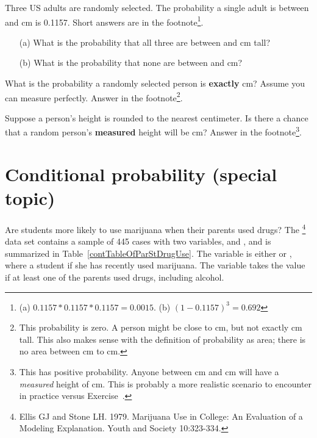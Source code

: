 \begin{exercise}
Three US adults are randomly selected. The probability a single adult is between  and  cm is 0.1157. Short answers are in the footnote\footnote{(a) $0.1157 * 0.1157 * 0.1157 = 0.0015$. (b) $(1-0.1157)^3 = 0.692$}. \vspace{-1.5mm}
\begin{enumerate}
\setlength{\itemsep}{0mm}
\item[(a)] What is the probability that all three are between  and  cm tall?
\item[(b)] What is the probability that none are between  and  cm?
\end{enumerate}
\end{exercise}

\begin{exercise}\label{probabilityOfExactly180cm}
What is the probability a randomly selected person is \textbf{exactly}  cm? Assume you can measure perfectly. Answer in the footnote\footnote{This probability is zero. A person might be close to  cm, but not exactly  cm tall. This also makes sense with the definition of probability as area; there is no area between  cm to  cm.}.
\end{exercise}

\begin{exercise}
Suppose a person's height is rounded to the nearest centimeter. Is there a chance that a random person's \textbf{measured} height will be  cm? Answer in the footnote\footnote{This has positive probability. Anyone between  cm and  cm will have a \emph{measured} height of  cm. This is probably a more realistic scenario to encounter in practice versus Exercise~.}.
\end{exercise}

\section{Conditional probability (special topic)}
\label{conditionalProbabilitySection}

Are students more likely to use marijuana when their parents used drugs? The \footnote{Ellis GJ and Stone LH. 1979. Marijuana Use in College: An Evaluation of a Modeling Explanation. Youth and Society 10:323-334.} data set contains a sample of 445 cases with two variables,  and , and is summarized in Table~\ref{contTableOfParStDrugUse}. The  variable is either  or , where a student  if she has recently used marijuana. The  variable takes the value  if at least one of the parents used drugs, including alcohol.\vspace{-1mm}

